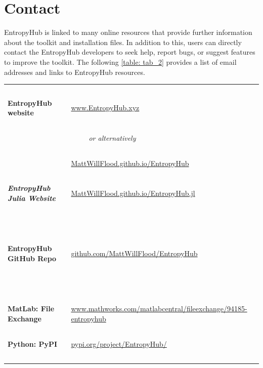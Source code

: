 \documentclass[12pt, a4paper, titlepage, openany]{book}
\begin{document}
\newpage
\section{\textbf{Contact}}
EntropyHub is linked to many online resources that provide further information about the toolkit and installation files. In addition to this, users can directly contact the EntropyHub developers to seek help, report bugs, or suggest features to improve the toolkit.
The following \ref{table: tab_2} provides a list of email addresses and links to EntropyHub resources.
\begin{center}
\begin{table}[!ht]
\begin{tabular}{|p{6cm}|p{10cm}|}
\hline
\rowcolor{ehone} \multicolumn{2}{|c|}{\textbf{\textcolor{white}{Online Resources}}} \\
\hline
\ 					& \ \\	 
\textbf{EntropyHub website}	&	\href{https://www.EntropyHub.xyz}{www.EntropyHub.xyz}	\\
\ 					& \ \\	 
\ 					& \ \ \ \ \ \emph{or alternatively} \\
\ 					& \ \\	 
\ 					& \href{https://MattWillFlood.github.io/EntropyHub}{MattWillFlood.github.io/EntropyHub} \\
\ 					& \ \\	 
\textbf{\textit{EntropyHub Julia Website}} & \href{https://MattWillFlood.github.io/EntropyHub.jl}{MattWillFlood.github.io/EntropyHub.jl} \\
\ 					& \ \\	 
\ 					& \ \\	
\ 					& \ \\	
\textbf{EntropyHub GitHub Repo}	&	\href{https://github.com/MattWillFlood/EntropyHub}{github.com/MattWillFlood/EntropyHub}	\\
\ 					& \ \\	 
\ 					& \ \\	
\ 					& \ \\	
\textbf{MatLab: File Exchange}	&	\href{https://www.mathworks.com/matlabcentral/fileexchange/94185-entropyhub}{www.mathworks.com/matlabcentral/fileexchange/94185-entropyhub}	\\
\ 					& \ \\	 
\textbf{Python: PyPI }	&	\href{https://pypi.org/project/EntropyHub/}{pypi.org/project/EntropyHub/}	\\
\ 					& \ \\	 

\end{tabular}
\end{table}
\end{center}
\end{document}

